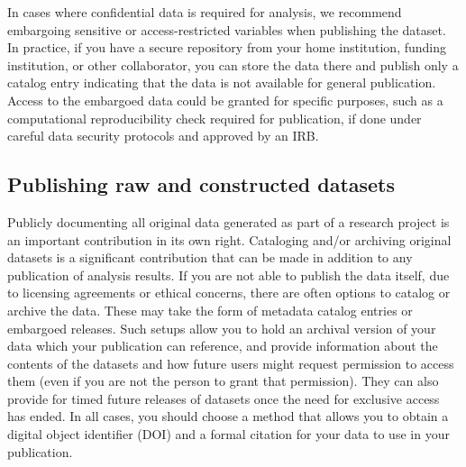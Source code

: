 In cases where confidential data is required for analysis,
we recommend embargoing sensitive or access-restricted variables when publishing the dataset.
In practice, if you have a secure repository from your
home institution, funding institution, or other collaborator,
you can store the data there
and publish only a catalog entry
indicating that the data is not available for general publication.
Access to the embargoed data could be granted for specific purposes,
such as a computational reproducibility check required for publication,
if done under careful data security protocols and approved by an IRB.

\subsection{Publishing raw and constructed datasets}

Publicly documenting all original data generated as part of a research project
is an important contribution in its own right.
Cataloging and/or archiving original datasets
is a significant contribution that can be made
in addition to any publication of analysis results.
If you are not able to publish the data itself,
due to licensing agreements or ethical concerns,
there are often options to catalog or archive the data.
These may take the form of metadata catalog entries or embargoed releases.
Such setups allow you to hold an archival version of your data
which your publication can reference,
and provide information about the contents of the datasets
and how future users might request permission to access them
(even if you are not the person to grant that permission).
They can also provide for timed future releases of datasets
once the need for exclusive access has ended.
In all cases, you should choose a method that allows you
to obtain a digital object identifier (DOI)
and a formal citation for your data to use in your publication.

